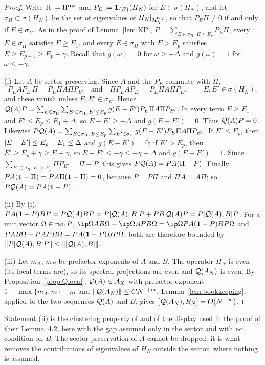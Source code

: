 \begin{proof}
Write $\Pi:=\Pi^{\mathbf{n}_N}$ and $P_E:=\mathbf{1}_{\{E\}}(H_N)$ for $E\in\sigma(H_N)$, and let $\sigma_\Pi\subset\sigma(H_N)$ be the set of
eigenvalues of $H_N|_{\mathcal{H}_N^{\mathbf{n}_N}}$, so that $P_E\Pi\ne0$ if and only if $E\in\sigma_\Pi$. As in the proof of
Lemma~\ref{lem:KP}, $P=\sum_{E\in\sigma_\Pi,\,E\le E_p}P_E\Pi$; every $E\in\sigma_\Pi$ satisfies $E\ge E_1$, and every $E\in\sigma_\Pi$ with $E>E_p$
satisfies $E\ge E_{p+1}\ge E_p+\gamma$. Recall that $g(\omega)=0$ for $\omega\ge-\Delta$ and $g(\omega)=1$ for
$\omega\le-\gamma$.

(i) Let $A$ be sector-preserving. Since $A$ and the $P_E$ commute with $\Pi$,
\begin{equation}\label{eq:ix-blocks}
P_EAP_{E'}\Pi=P_E\Pi A\Pi P_{E'}\quad\text{and}\quad\Pi P_EAP_{E'}=P_E\Pi A\Pi P_{E'},\qquad E,E'\in\sigma(H_N),
\end{equation}
and these vanish unless $E,E'\in\sigma_\Pi$. Hence $\mathcal{Q}(A)P=\sum_{E\in\sigma_\Pi}\sum_{E'\in\sigma_\Pi,\,E'\le E_p}g(E-E')P_E\Pi A\Pi P_{E'}$. In
every term $E\ge E_1$ and $E'\le E_p\le E_1+\Delta$, so $E-E'\ge-\Delta$ and $g(E-E')=0$. Thus $\mathcal{Q}(A)P=0$. Likewise
$P\mathcal{Q}(A)=\sum_{E\in\sigma_\Pi,\,E\le E_p}\sum_{E'\in\sigma_\Pi}g(E-E')P_E\Pi A\Pi P_{E'}$. If $E'\le E_p$, then $\lvert E-E'\rvert\le E_p-E_1\le\Delta$
and $g(E-E')=0$; if $E'>E_p$, then $E'\ge E_p+\gamma\ge E+\gamma$, so $E-E'\le-\gamma\le-\gamma+\Delta$ and $g(E-E')=1$.
Since $\sum_{E'\in\sigma_\Pi,\,E'>E_p}\Pi P_{E'}=\Pi-P$, this gives $P\mathcal{Q}(A)=PA(\Pi-P)$. Finally $PA(\mathbf{1}-\Pi)=PA\Pi(\mathbf{1}-\Pi)=0$,
because $P=P\Pi$ and $\Pi A=A\Pi$; so $P\mathcal{Q}(A)=PA(\mathbf{1}-P)$.

(ii) By (i), $PA(\mathbf{1}-P)BP=P\mathcal{Q}(A)BP=P[\mathcal{Q}(A),B]P+PB\,\mathcal{Q}(A)P=P[\mathcal{Q}(A),B]P$. For a unit vector $\Omega\in\operatorname{ran} P$,
$\ip\Omega{AB\Omega}-\ip\Omega{APB\Omega}=\ip\Omega{PA(\one-P)BP\Omega}$ and $PAB\Omega-PAPB\Omega=PA(\mathbf{1}-P)BP\Omega$; both are
therefore bounded by $\lVert P[\mathcal{Q}(A),B]P\rVert\le\lVert[\mathcal{Q}(A),B]\rVert$.

(iii) Let $m_A$, $m_B$ be prefactor exponents of $A$ and $B$. The operator $H_N$ is even (its local terms are), so its
spectral projections are even and $\mathcal{Q}(A_N)$ is even. By Proposition~\ref{prop:Qlocal}, $\mathcal{Q}(A)\in\mathcal{A}_X$ with prefactor
exponent $1+\max\{m_A,m\}+m$ and $\lVert\mathcal{Q}(A_N)\rVert\le CN^{1+m}$. Lemma~\ref{lem:bookkeeping}, applied to the two sequences
$\mathcal{Q}(A)$ and $B$, gives $[\mathcal{Q}(A_N),B_N]=O(N^{-\infty})$.
\end{proof}

Statement (ii) is the clustering property of \cite[Proposition~3.1]{BBDF21} and of the display used in the proof
of their Lemma~4.2, here with the gap assumed only in the sector and with no condition on $B$. The
sector preservation of $A$ cannot be dropped: it is what removes the contributions of eigenvalues of $H_N$
outside the sector, where nothing is assumed.

